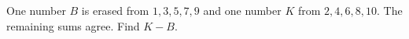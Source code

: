 One number $B$ is erased from $1,3,5,7,9$ and one number $K$ from $2,4,6,8,10$. The remaining sums agree. Find $K-B$.
